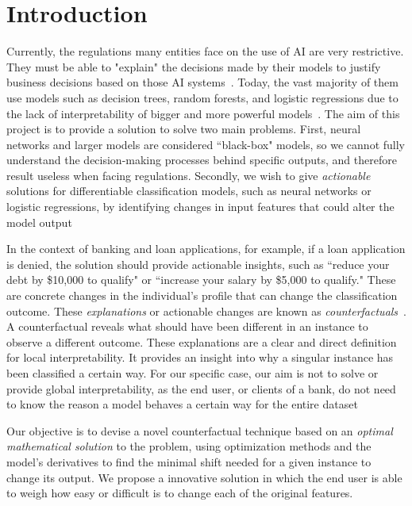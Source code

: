 \documentclass[12pt]{extarticle}
\numberwithin{equation}{section}
\begin{document}
\section{Introduction}
Currently, the regulations many entities face on the use of AI are very restrictive. They must be able to "explain" the decisions made by their models to justify business decisions based on those AI systems~\cite{cohen2021black}. Today, the vast majority of them use models such as decision trees, random forests, and logistic regressions due to the lack of interpretability 
of bigger and more powerful models~\cite{ghatasheh2014business,pointofview}. The aim of this project is to provide a solution to solve two main problems. First, neural networks and larger models are considered ``black-box" models, so we cannot fully understand the decision-making processes behind specific outputs, and therefore result useless when facing regulations. Secondly, we wish to give \emph{actionable} solutions for differentiable classification models, such as neural networks or logistic regressions, by identifying changes in input features that could alter the model output

In the context of banking and loan applications, for example, if a loan application is denied, the solution should provide actionable insights, such as ``reduce your debt by \$10,000 to qualify" or ``increase your salary by \$5,000 to qualify." These are concrete changes in the individual's profile that can change the classification outcome. These \emph{explanations} or actionable changes are known as \emph{counterfactuals}~\cite{wachter2017counterfactual,guidotti2024counterfactual}. A counterfactual reveals what should have been different in an instance to observe a different outcome. These explanations are a clear and direct definition for local interpretability. It provides an insight into why a singular instance has been classified a certain way. For our specific case, our aim is not to solve or provide global interpretability, as the end user, or clients of a bank, do not need to know the reason a model behaves a certain way for the entire dataset

Our objective is to devise a novel counterfactual technique based on an \emph{optimal mathematical solution} to the problem, using optimization methods and the model's derivatives to find the minimal shift needed for a given instance to change its output. We propose a innovative solution in which the end user is able to weigh how easy or difficult is to change each of the original features.
\end{document}
